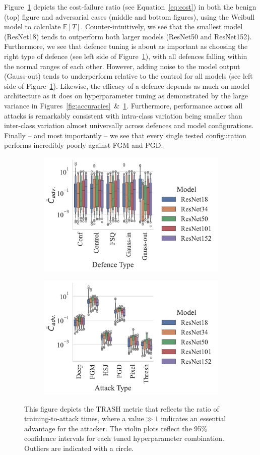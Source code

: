 Figure~\ref{fig:failures_per_train_time} depicts the cost-failure ratio (see Equation~\ref{eq:cost}) in both the benign (top) figure and adversarial cases (middle and bottom figures), using the Weibull model to calculate $\mathbb{E}[T]$. Counter-intuitively, we see that the smallest model (ResNet18) tends to outperform both larger models (ResNet50 and ResNet152). Furthermore, we see that defence tuning is about as important as choosing the right type of defence (see left side of Figure~\ref{fig:failures_per_train_time}), with all defences falling within the normal ranges of each other. However, adding noise to the model output (Gauss-out) tends to underperform relative to the control for all models (see left side of Figure~\ref{fig:failures_per_train_time}). Likewise, the efficacy of a defence depends as much on model architecture as it does on hyperparameter tuning as demonstrated by the large variance in Figures~\ref{fig:accuracies}~\&~\ref{fig:failures_per_train_time}.  Furthermore, performance across all attacks is remarkably consistent with intra-class variation being smaller than inter-class variation almost universally across defences and model configurations.
Finally -- and most importantly -- we see that every single tested configuration performs incredibly poorly against FGM and PGD.

\begin{figure}[!h]
    \centering
    \begin{subfigure}
        \centering
        \includegraphics[width=.38\textwidth,trim={12pt 10pt 20pt 10pt},clip]{plots/trash_score_vs_defence_type.pdf}
    \end{subfigure}
    \begin{subfigure}
        \centering
        \includegraphics[width=.38\textwidth,trim={12pt 10pt 20pt 10pt},clip]{plots/trash_score_vs_attack_type.pdf}
    \end{subfigure}
    \caption{This figure depicts the TRASH metric that reflects the ratio of training-to-attack times, where a value$\gg 1 $  indicates an essential advantage for the attacker. The violin plots reflect the 95\% confidence intervals for each tuned hyperparameter combination. Outliers are indicated with a circle.}
    \label{fig:failures_per_train_time}
\end{figure}
